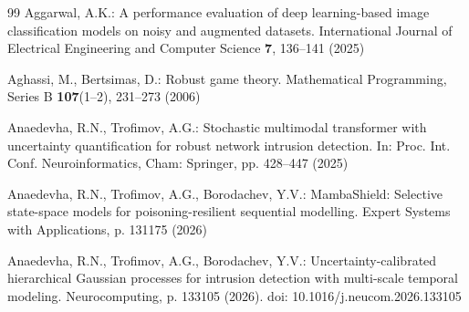 \documentclass[12pt,a4paper]{article}
\theoremstyle{definition}
\begin{document}
\begin{thebibliography}{99}
Aggarwal, A.K.: A performance evaluation of deep learning-based image classification models on noisy and augmented datasets. International Journal of Electrical Engineering and Computer Science \textbf{7}, 136--141 (2025)

Aghassi, M., Bertsimas, D.: Robust game theory. Mathematical Programming, Series B \textbf{107}(1--2), 231--273 (2006)

Anaedevha, R.N., Trofimov, A.G.: Stochastic multimodal transformer with uncertainty quantification for robust network intrusion detection. In: Proc. Int. Conf. Neuroinformatics, Cham: Springer, pp. 428--447 (2025)

Anaedevha, R.N., Trofimov, A.G., Borodachev, Y.V.: MambaShield: Selective state-space models for poisoning-resilient sequential modelling. Expert Systems with Applications, p. 131175 (2026)

Anaedevha, R.N., Trofimov, A.G., Borodachev, Y.V.: Uncertainty-calibrated hierarchical Gaussian processes for intrusion detection with multi-scale temporal modeling. Neurocomputing, p. 133105 (2026). doi: 10.1016/j.neucom.2026.133105

\end{thebibliography}
\end{document}
